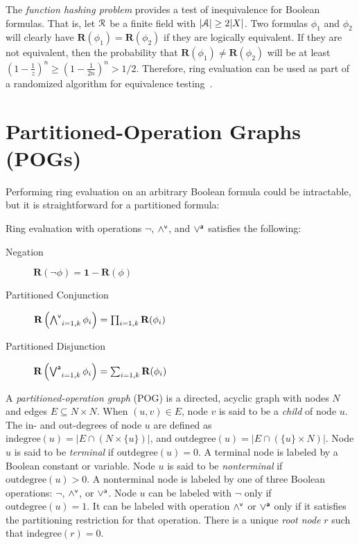 \documentclass[letterpaper,USenglish,cleveref, autoref, thm-restate]{lipics-v2021}
\newcommand{\pand}{\mathbin{\land^{\sf v}}}
\newcommand{\por}{\mathbin{\lor^{\sf a}}}
\DeclareMathOperator*{\Pand}{\bigwedge^{\sf v}}
\DeclareMathOperator*{\Por}{\bigvee^{\sf a}}
\newcommand{\boolnot}{\neg}
\newcommand{\varset}{X}
\newcommand{\ring}{{\cal R}}
\newcommand{\dset}{{\cal A}}
\newcommand{\rep}{\textbf{R}}
\newcommand{\mulident}{\textbf{1}}
\newcommand{\indegree}{\textrm{indegree}}
\newcommand{\outdegree}{\textrm{outdegree}}
\begin{document}
The {\em function hashing problem} provides a test
of inequivalence for Boolean formulas.  That is, let $\ring$ be a
finite  field with $|\dset| \geq 2 |\varset|$.  Two formulas
$\phi_1$ and $\phi_2$ will clearly have $\rep(\phi_1) = \rep(\phi_2)$
if they are logically equivalent.  If they are not equivalent, then
the probability that $\rep(\phi_1) \not = \rep(\phi_2)$ will be at
least $\left(1-\frac{1}{z}\right)^n \geq \left(1-\frac{1}{2n}\right)^n > 1/2$.
Therefore, ring evaluation can be used as part of a
randomized algorithm for equivalence testing~\cite{blum:ipl:1980}.

\section{Partitioned-Operation Graphs (POGs)}

Performing ring evaluation on an arbitrary Boolean formula could be intractable, but it is straightforward for a partitioned formula:
\begin{proposition}
Ring evaluation with operations $\boolnot$, $\pand$, and $\por$ satisfies the following:
\begin{description}
\item[Negation] $\rep(\boolnot \phi) = \mulident - \rep(\phi)$
\item[Partitioned Conjunction] $\rep\left(\Pand_{i=1,k} \phi_i\right) = \prod_{i=1,k} \rep(\phi_i)$
\item[Partitioned Disjunction] $\rep\left(\Por_{i=1,k} \phi_i\right) = \sum_{i=1,k} \rep(\phi_i)$
\end{description}
\end{proposition}

A {\em partitioned-operation graph} (POG) is a directed, acyclic graph
with nodes $N$ and edges $E \subseteq N \times N$.  When $(u,v) \in E$,
node $v$ is said to be a {\em child} of node $u$.
The in- and out-degrees of node $u$ are defined as $\indegree(u) = | E \cap (N \times \{u\}) |$, and
$\outdegree(u) = | E \cap (\{u\} \times N) |$.
Node $u$ is said to be {\em terminal} if $\outdegree(u) = 0$.  A terminal node is labeled by a Boolean constant or variable.
Node $u$ is said to be {\em nonterminal} if $\outdegree(u) > 0$.  A nonterminal node is labeled by one of three Boolean operations:
$\boolnot$, $\pand$, or $\por$.  Node $u$ can be labeled with $\boolnot$ only if $\outdegree(u) = 1$.
It can be labeled with operation $\pand$ or $\por$ only if it satisfies the partitioning restriction for that operation.
There is a unique {\em root node} $r$ such that $\indegree(r) = 0$.
\end{document}
